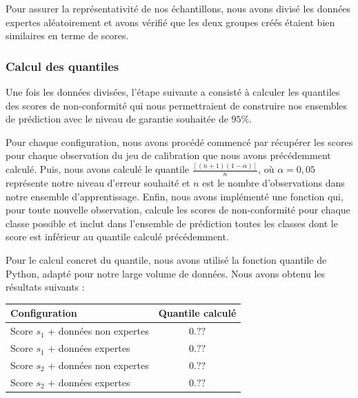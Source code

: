 \documentclass[a4paper,12pt]{article}
\begin{document}
\vspace{0.2cm}

Pour assurer la représentativité de nos échantillons, nous avons divisé les données expertes aléatoirement et avons vérifié que les deux groupes créés étaient bien similaires en terme de scores.

\subsubsection{Calcul des quantiles}

Une fois les données divisées, l'étape suivante a consisté à calculer les quantiles des scores de non-conformité qui nous permettraient de construire nos ensembles de prédiction avec le niveau de garantie souhaitée de $95\%$.

\vspace{0.2cm}

Pour chaque configuration, nous avons procédé commencé par récupérer les scores pour chaque observation du jeu de calibration que nous avons précédemment calculé. Puis, nous avons calculé le quantile $\frac{[(n+1)(1 - \alpha)]}{n}$, où $\alpha = 0,05$ représente notre niveau d'erreur souhaité et $n$ est le nombre d'observations dans notre ensemble d'apprentissage. Enfin, nous avons implémenté une fonction qui, pour toute nouvelle observation, calcule les scores de non-conformité pour chaque classe possible et inclut dans l'ensemble de prédiction toutes les classes dont le score est inférieur au quantile calculé précédemment.

\vspace{0.2cm}

Pour le calcul concret du quantile, nous avons utilisé la fonction quantile de Python, adapté pour notre large volume de données. Nous avons obtenu les résultats suivants : 

\begin{center}
    \begin{tabular}{|l|c|}
        \hline
        Configuration & Quantile calculé \\
        \hline
        Score $s_1$ + données non expertes & $0.??$ \\
        Score $s_1$ + données expertes & $0.??$ \\
        Score $s_2$ + données non expertes & $0.??$ \\
        Score $s_2$ + données expertes & $0.??$ \\
        \hline
        \end{tabular}
    \end{center}
\end{document}
